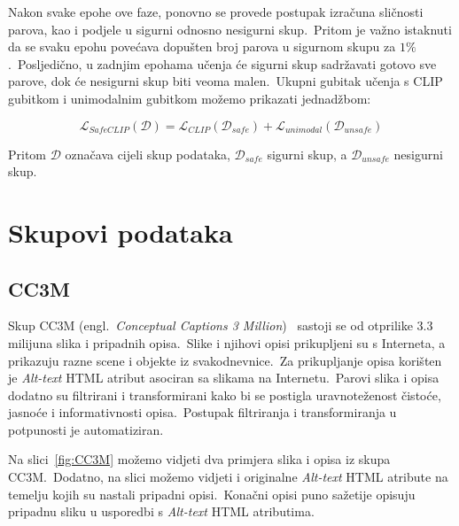 \documentclass[times, utf8, seminar, numeric]{fer}
\begin{document}
Nakon svake epohe ove faze, ponovno se provede postupak izračuna sličnosti parova, kao i podjele u sigurni odnosno nesigurni skup.\ 
Pritom je važno istaknuti da se svaku epohu povećava dopušten broj parova u sigurnom skupu za $1\%$.\
Posljedično, u zadnjim epohama učenja će sigurni skup sadržavati gotovo sve parove, dok će nesigurni skup biti veoma malen.\ 
Ukupni gubitak učenja s CLIP gubitkom i unimodalnim gubitkom možemo prikazati jednadžbom:

\begin{equation}
    \mathcal{L}_{SafeCLIP}(\mathcal{D}) = \mathcal{L}_{CLIP}(\mathcal{D}_{safe}) + \mathcal{L}_{unimodal}(\mathcal{D}_{unsafe})
    \label{eq:total_loss}
\end{equation}

Pritom $\mathcal{D}$ označava cijeli skup podataka, $\mathcal{D}_{safe}$ sigurni skup, a $\mathcal{D}_{unsafe}$ nesigurni skup.\

\chapter{Skupovi podataka}

\section{CC3M}

Skup CC3M (engl.\ \textit{Conceptual Captions 3 Million})~\cite{sharma2018conceptual} sastoji se od otprilike 3.3 milijuna slika i pripadnih opisa.\ 
Slike i njihovi opisi prikupljeni su s Interneta, a prikazuju razne scene i objekte iz svakodnevnice.\ Za prikupljanje opisa korišten je \textit{Alt-text} HTML atribut asociran sa slikama na Internetu.\ 
Parovi slika i opisa dodatno su filtrirani i transformirani kako bi se postigla uravnoteženost čistoće, jasnoće i informativnosti opisa.\ Postupak filtriranja i transformiranja u potpunosti je automatiziran.\ 

Na slici~\ref{fig:CC3M} možemo vidjeti dva primjera slika i opisa iz skupa CC3M.\ Dodatno, na slici možemo vidjeti i originalne \textit{Alt-text} HTML atribute na temelju kojih su nastali pripadni opisi.\
Konačni opisi puno sažetije opisuju pripadnu sliku u usporedbi s \textit{Alt-text} HTML atributima.\
\end{document}
